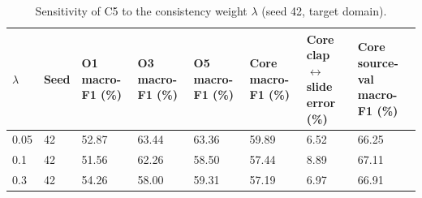 \begin{table}[t]
\centering
\small
\caption{Sensitivity of C5 to the consistency weight $\lambda$ (seed 42, target domain).}
\label{tab:T7_lambda_sensitivity}
\begin{tabular}{llllllll}
\hline
$\lambda$ & Seed & O1 macro-F1 (\%) & O3 macro-F1 (\%) & O5 macro-F1 (\%) & Core macro-F1 (\%) & Core clap$\leftrightarrow$slide error (\%) & Core source-val macro-F1 (\%) \\
\hline
0.05 & 42 & 52.87 & 63.44 & 63.36 & 59.89 & 6.52 & 66.25 \\
0.1 & 42 & 51.56 & 62.26 & 58.50 & 57.44 & 8.89 & 67.11 \\
0.3 & 42 & 54.26 & 58.00 & 59.31 & 57.19 & 6.97 & 66.91 \\
\hline
\end{tabular}
\end{table}
